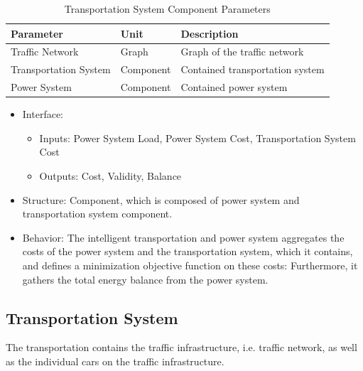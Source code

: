 	 \begin{table}[h]
	 	\renewcommand{\arraystretch}{1.3}
	 	\caption{Transportation System Component Parameters}
	 	\centering
	 	\begin{tabular}{lll}
	 		\hline
	 		\textbf{Parameter}                    & \textbf{Unit} & \textbf{Description} \\ \hline
	 		Traffic Network                  	  & Graph          & Graph of the traffic network      \\
	 		Transportation System                 & Component    & Contained transportation system    \\ 
	 		Power System                 		  & Component   & Contained power system    \\ \hline
	 	\end{tabular}
	 \end{table}
	 \begin{itemize}
	\item Interface: 
			\begin{itemize}
				\item Inputs: Power System Load, Power System Cost, Transportation System Cost
				\item Outputs: Cost, Validity, Balance
			\end{itemize}	
	\item Structure: Component, which is composed of power system and transportation system component.
	\item Behavior: The intelligent transportation and power system aggregates the costs of the power system and the transportation system, which it contains, and defines a minimization objective function on these costs:
	Furthermore, it gathers the total energy balance from the power system.
\end{itemize}


\subsection{Transportation System}

The transportation contains the traffic infrastructure, i.e. traffic network,  as well as the individual cars on the traffic infrastructure.

